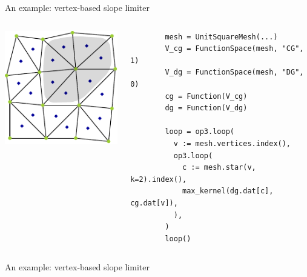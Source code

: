 \documentclass[aspectratio=169]{beamer}
\begin{document}
\begin{frame}[fragile]{An example: vertex-based slope limiter}
  \vspace{-2em}
  \begin{columns}
    \begin{column}{0.5\textwidth}
      \begin{center}
        \includegraphics[width=.8\textwidth]{slope_limiter.pdf}
      \end{center}
    \end{column}
    \begin{column}{0.5\textwidth}
      \begin{verbatim}
        mesh = UnitSquareMesh(...)
        V_cg = FunctionSpace(mesh, "CG", 1)
        V_dg = FunctionSpace(mesh, "DG", 0)
        cg = Function(V_cg)
        dg = Function(V_dg)

        loop = op3.loop(
          v := mesh.vertices.index(),
          op3.loop(
            c := mesh.star(v, k=2).index(),
            max_kernel(dg.dat[c], cg.dat[v]),
          ),
        )
        loop()
      \end{verbatim}
    \end{column}
  \end{columns}
\end{frame}

\begin{frame}[fragile]{An example: vertex-based slope limiter}
  \vspace{-1em}
  \inputminted[fontsize=\footnotesize,linenos]{c}{c_code_tidy.c}
\end{frame}
\end{document}
